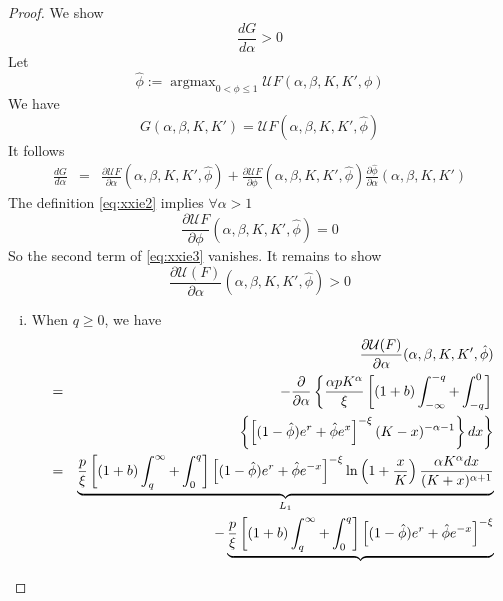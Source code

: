 \documentclass{article}
\newcommand{\td}[2]{
  \frac{d #1}{d #2}
}
\newcommand{\pd}[2]{
  \frac{\partial #1}{\partial #2}
}
\newcommand{\1}[1]{
  \mathbf{1}_{\{#1\}}
}
\DeclareMathOperator*{\argmax}{argmax}
\begin{document}
\begin{proof}
  We show
  \[
  \td{G}{\alpha} > 0
  \]
  Let
  \begin{equation}
    \label{eq:xxie2}
    \hat \phi := \argmax_{0 < \phi \leq 1}
    \mathcal U F(\alpha, \beta, K, K', \phi)
  \end{equation}
  We have
  \[
  G(\alpha, \beta, K, K') = \mathcal U F(\alpha, \beta, K, K', \hat \phi)
  \]
  It follows
  \begin{eqnarray}
    \td{G}{\alpha}
    &=&
    \pd{\mathcal U F}{\alpha}(\alpha, \beta, K, K', \hat \phi)
    + \pd{\mathcal U F}{\phi}(\alpha, \beta, K, K', \hat \phi)
    \pd{\hat \phi}{\alpha}(\alpha, \beta, K, K')
    \label{eq:xxie3}
  \end{eqnarray}
  The definition \eqref{eq:xxie2} implies $\forall \alpha > 1$
  \begin{equation}
    \label{eq:xxie4}
    \pd{\mathcal U F}{\phi}(\alpha, \beta, K, K', \hat \phi) = 0
  \end{equation}
  So the second term of \eqref{eq:xxie3} vanishes. It remains to show
  \[
  \pd{\mathcal U(F)}{\alpha}(\alpha, \beta, K, K', \hat \phi) > 0
  \]
  \begin{enumerate}[i.]
  \item When $q \geq 0$, we have
    \begin{eqnarray*}
      && \pd{\mathcal U(F)}{\alpha}(\alpha, \beta, K, K', \hat \phi) \\
      &=&
      - \frac{\partial}{\partial \alpha} \left\{
        {\alpha p K^\alpha \over \xi}
        \left[
          (1 + b)\int_{-\infty}^{-q} +
          \int_{-q}^0
        \right] \right. \\
      && \left.
        \left\{
          \left[
            (1 - \hat\phi) e^r + \hat\phi e^x
          \right]^{-\xi}
          (K - x)^{-\alpha - 1}
        \right\}
        dx \right\} \\
      &=& \underbrace{
        {p \over \xi}
        \left[
          (1 + b)\int_{q}^{\infty} +
          \int_{0}^q
        \right]
        \left[
          (1 - \hat\phi) e^r + \hat\phi e^{-x}
        \right]^{-\xi}
        \ln \left(
          1 + {x \over K}
        \right)
        {\alpha K^{\alpha} dx
          \over
          (K + x)^{\alpha + 1}
        }
      }_{L_1} \\
      && - \underbrace{
        {p \over \xi}
        \left[
          (1 + b)\int_{q}^{\infty} +
          \int_{0}^q
        \right]
        \left[
          (1 - \hat\phi) e^r + \hat\phi e^{-x}
        \right]^{-\xi}
}
\end{eqnarray*}
\end{enumerate}
\end{proof}
\end{document}
